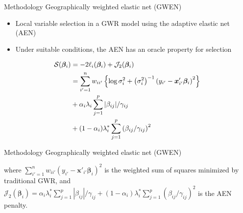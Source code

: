\documentclass[12pt,t,handout]{beamer}
\newcommand{\subt}[1]{{\footnotesize \color{subtitle} {#1}}}
\begin{document}
\begin{frame}{Methodology}
\subt{Geographically weighted elastic net (GWEN)}

\bigskip
\begin{itemize}
    \item Local variable selection in a GWR model using the adaptive elastic net (AEN) \citep{Zou:2009}
    \item Under suitable conditions, the AEN has an oracle property for selection
\end{itemize}

\begin{align}
		\mathcal{S}(\bm{\beta}_i) &= -2 \ell_i(\bm{\beta}_i) + \mathcal{J}_2(\bm{\beta}_i) \notag \\
		&= \sum_{i'=1}^n w_{ii'}  \left\{ \log{\sigma^2_i}  + \left(\sigma^2_i\right)^{-1}  \left(y_{i'} - \bm{x}'_{i'} \bm{\beta}_i \right)^2 \right\}   \notag \\
		&+ \alpha_i \lambda_i \sum_{j=1}^p |\beta_{ij}| / \gamma_{ij} \notag \\
		&+ (1-\alpha_i) \lambda^*_i \sum_{j=1}^p  \left( \beta_{ij} / \gamma_{ij} \right)^2 \notag
	\end{align}

\end{frame}



\begin{frame}{Methodology}
\subt{Geographically weighted elastic net (GWEN)}

\bigskip
where $\sum_{i'=1}^n w_{ii'} \left(y_{i'} - \bm{x}'_{i'} \bm{\beta}_i \right)^2$ is the weighted sum of squares minimized by traditional GWR, and $\mathcal{J}_2(\bm{\beta}_i) = \alpha_i \lambda^*_i \sum_{j=1}^p |\beta_{ij}| / \gamma_{ij} + (1-\alpha_i) \lambda^*_i \sum_{j=1}^p  \left( \beta_{ij} / \gamma_{ij} \right)^2$ is the AEN penalty.

\end{frame}
\end{document}
